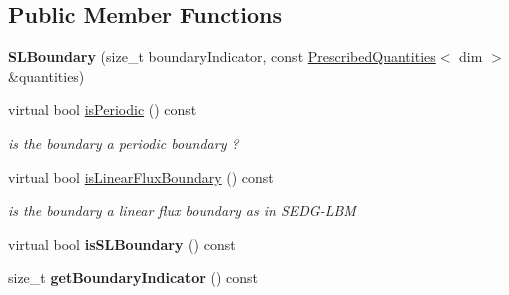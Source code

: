 \subsection*{Public Member Functions}
\begin{DoxyCompactItemize}
\item 
\hypertarget{classnatrium_1_1SLBoundary_a47ab6f4a95d19e5590a89e5ad6f83390}{
{\bfseries SLBoundary} (size\_\-t boundaryIndicator, const \hyperlink{classnatrium_1_1PrescribedQuantities}{PrescribedQuantities}$<$ dim $>$ \&quantities)}
\label{classnatrium_1_1SLBoundary_a47ab6f4a95d19e5590a89e5ad6f83390}

\item 
\hypertarget{classnatrium_1_1SLBoundary_a71fbdf8cec050dabc8a9515209e1cf9c}{
virtual bool \hyperlink{classnatrium_1_1SLBoundary_a71fbdf8cec050dabc8a9515209e1cf9c}{isPeriodic} () const }
\label{classnatrium_1_1SLBoundary_a71fbdf8cec050dabc8a9515209e1cf9c}

\begin{DoxyCompactList}\small\item\em is the boundary a periodic boundary ? \item\end{DoxyCompactList}\item 
\hypertarget{classnatrium_1_1SLBoundary_ad09ab98f91e8dc00fc4b624937b1b905}{
virtual bool \hyperlink{classnatrium_1_1SLBoundary_ad09ab98f91e8dc00fc4b624937b1b905}{isLinearFluxBoundary} () const }
\label{classnatrium_1_1SLBoundary_ad09ab98f91e8dc00fc4b624937b1b905}

\begin{DoxyCompactList}\small\item\em is the boundary a linear flux boundary as in SEDG-\/LBM \item\end{DoxyCompactList}\item 
\hypertarget{classnatrium_1_1SLBoundary_a70cb2434ebca8eea14d583ddb2dd7aa7}{
virtual bool {\bfseries isSLBoundary} () const }
\label{classnatrium_1_1SLBoundary_a70cb2434ebca8eea14d583ddb2dd7aa7}

\item 
\hypertarget{classnatrium_1_1SLBoundary_a9b8906be20bc88f40b37e2aa82e617f1}{
size\_\-t {\bfseries getBoundaryIndicator} () const }
\label{classnatrium_1_1SLBoundary_a9b8906be20bc88f40b37e2aa82e617f1}


\end{DoxyCompactItemize}
